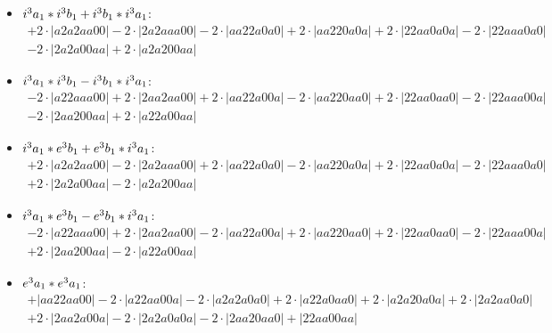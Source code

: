\documentclass{article}
\begin{document}
\begin{itemize}
$$\begin{array}{c}
\end{array}$$
\item \boldmath$i^3 a_1 * i^3 b_{1} + i^3 b_{1} * i^3 a_1 \displaystyle $\unboldmath : \quad$$\begin{array}{c}
+2 \cdot \left|a2a2aa00\right| -2 \cdot \left|2a2aaa00\right| -2 \cdot \left|aa22a0a0\right| +2 \cdot \left|aa220a0a\right| +2 \cdot \left|22aa0a0a\right| -2 \cdot \left|22aaa0a0\right| \\[0.5cm] -2 \cdot \left|2a2a00aa\right| +2 \cdot \left|a2a200aa\right|
\end{array}$$
\item \boldmath$i^3 a_1 * i^3 b_{1} - i^3 b_{1} * i^3 a_1 \displaystyle $\unboldmath : \quad$$\begin{array}{c}
-2 \cdot \left|a22aaa00\right| +2 \cdot \left|2aa2aa00\right| +2 \cdot \left|aa22a00a\right| -2 \cdot \left|aa220aa0\right| +2 \cdot \left|22aa0aa0\right| -2 \cdot \left|22aaa00a\right| \\[0.5cm] -2 \cdot \left|2aa200aa\right| +2 \cdot \left|a22a00aa\right|
\end{array}$$
\item \boldmath$i^3 a_1 * e^3 b_{1} + e^3 b_{1} * i^3 a_1 \displaystyle $\unboldmath : \quad$$\begin{array}{c}
+2 \cdot \left|a2a2aa00\right| -2 \cdot \left|2a2aaa00\right| +2 \cdot \left|aa22a0a0\right| -2 \cdot \left|aa220a0a\right| +2 \cdot \left|22aa0a0a\right| -2 \cdot \left|22aaa0a0\right| \\[0.5cm] +2 \cdot \left|2a2a00aa\right| -2 \cdot \left|a2a200aa\right|
\end{array}$$
\item \boldmath$i^3 a_1 * e^3 b_{1} - e^3 b_{1} * i^3 a_1 \displaystyle $\unboldmath : \quad$$\begin{array}{c}
-2 \cdot \left|a22aaa00\right| +2 \cdot \left|2aa2aa00\right| -2 \cdot \left|aa22a00a\right| +2 \cdot \left|aa220aa0\right| +2 \cdot \left|22aa0aa0\right| -2 \cdot \left|22aaa00a\right| \\[0.5cm] +2 \cdot \left|2aa200aa\right| -2 \cdot \left|a22a00aa\right|
\end{array}$$
\item \boldmath$e^3 a_1 * e^3 a_1 \displaystyle $\unboldmath : \quad$$\begin{array}{c}
+\left|aa22aa00\right| -2 \cdot \left|a22aa00a\right| -2 \cdot \left|a2a2a0a0\right| +2 \cdot \left|a22a0aa0\right| +2 \cdot \left|a2a20a0a\right| +2 \cdot \left|2a2aa0a0\right| \\[0.5cm] +2 \cdot \left|2aa2a00a\right| -2 \cdot \left|2a2a0a0a\right| -2 \cdot \left|2aa20aa0\right| +\left|22aa00aa\right|

\end{array}$$
\end{itemize}
\end{document}
